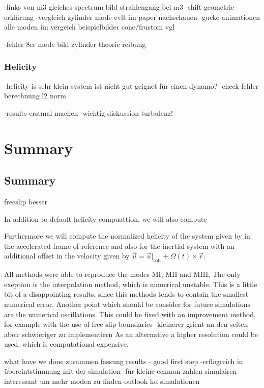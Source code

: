 -links von m3 gleiches spectrum bild strahlengang bei m3
-shift geometrie erklärung
-vergleich zylinder mode evlt im paper nachschauen
-gucke animationen alle moden im vergeich beispielbilder  cone/frustom vgl

-fehler 8er mode bild zylinder theorie reibung

\subsubsection{Helicity}

-helicity is sehr klein system ist nicht gut geignet für einen dynamo?
-check fehler berechnung l2 norm




-results erstmal machen
-wichtig diskussion turbulenz!



\section{Summary}
\subsection{Summary}
freeslip besser

In addition to default helicity compuattion, we will also compute

Furthermore we will compute the normalized helicity of the system given by
in the accelerated frame of reference and also for the inertial system with an additional offset in the velocity
given by $\vec{u} = \vec{u}|_{\text{rot.}} + \Omega(t) \times \vec{r}$.

All methods were able to reproduce the modes M\RN{1}, M\RN{2} and M\RN{3},
The only exeption is the interpolation method, which is numerical unstable.
This is a little bit of a disappointing results, since this methods tends to contain
the smallest numerical error.
Another point which should be consider for future simulations are the numerical oscillations.
This could be fixed with an improvement method, for example with the use of free slip boundaries
-kleinerer grient an den seiten
-abeir schwieriger zu implementiern
As an alternative a higher resolution  could be used, which is computational expensive.

what have we done
zusammen fassung results
- good first step
-erflogreich in übereintstimmung mit der simulation
-für kleine eckman zahlen simulairen interessant um mehr moden zu finden
outlook hd simulationen
